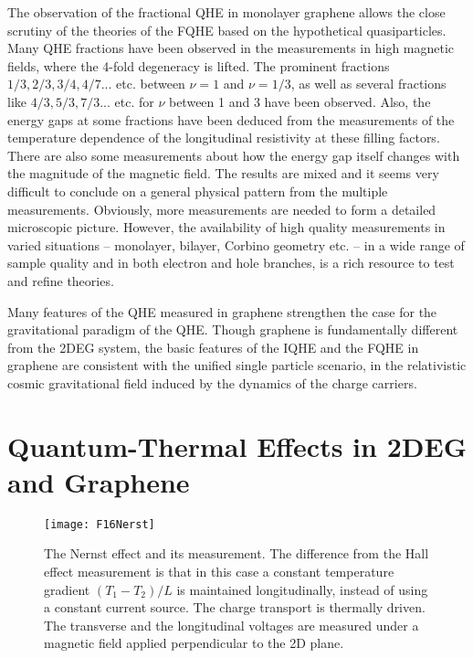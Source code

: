 \documentclass[aps,preprint,12pt,tightenlines]{revtex4}%
\begin{document}
The observation of the fractional QHE in monolayer graphene allows the close
scrutiny of the theories of the FQHE based on the hypothetical quasiparticles.
Many QHE fractions have been observed in the measurements in high magnetic
fields, where the 4-fold degeneracy is lifted. The prominent fractions
$1/3,2/3,3/4,4/7...$ etc. between $\nu=1$ and $\nu=1/3$, as well as several
fractions like $4/3,5/3,7/3...$ etc. for $\nu$ between 1 and 3 have been
observed. Also, the energy gaps at some fractions have been deduced from the
measurements of the temperature dependence of the longitudinal resistivity at
these filling factors. There are also some measurements about how the energy
gap itself changes with the magnitude of the magnetic field. The results are
mixed and it seems very difficult to conclude on a general physical pattern
from the multiple measurements. Obviously, more measurements are needed to
form a detailed microscopic picture. However, the availability of high quality
measurements in varied situations -- monolayer, bilayer, Corbino geometry etc.
-- in a wide range of sample quality and in both electron and hole branches,
is a rich resource to test and refine theories.

Many features of the QHE measured in graphene strengthen the case for the
gravitational paradigm of the QHE. Though graphene is fundamentally different
from the 2DEG system, the basic features of the IQHE and the FQHE in graphene
are consistent with the unified single particle scenario, in the relativistic
cosmic gravitational field induced by the dynamics of the charge carriers.

\section{Quantum-Thermal Effects in 2DEG and Graphene}

\begin{figure}
	\centering
	\texttt{[image: F16Nerst]}
	\caption{The Nernst effect and its measurement. The difference from the Hall effect measurement is that in this case a constant temperature gradient $\left( T_{1}-T_{2}\right) /L$ is maintained longitudinally, instead of using a constant current source. The charge transport is thermally driven. The transverse and the longitudinal voltages are measured under a magnetic field applied perpendicular to the 2D plane.}
	\label{fig:nerst}
\end{figure}
\end{document}
